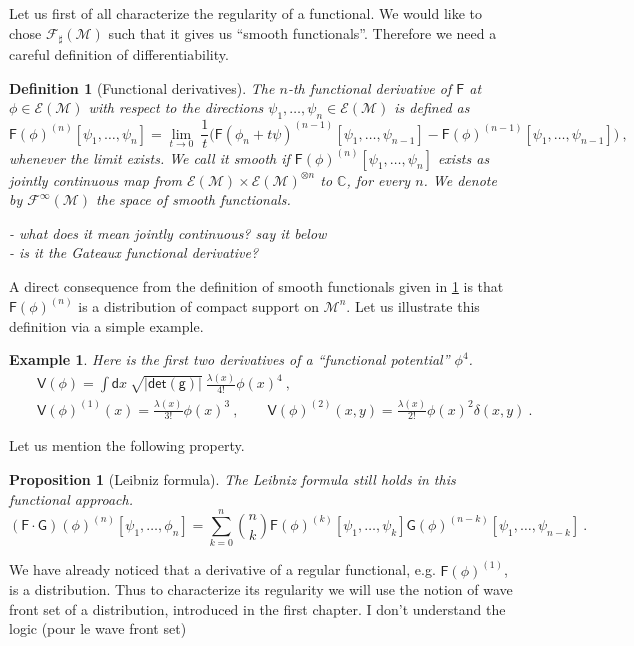 \documentclass[10pt]{book}
\newcommand{\abs}[1]{\left|#1\right|}
\renewcommand{\det}{\mathsf{det}}
\newcommand{\Ecal}{\mathcal{E}}
\newcommand{\Fcal}{\mathcal{F}}
\newcommand{\Mcal}{\mathcal{M}}
\newcommand{\Cbb}{\mathbb{C}}
\newcommand{\Fsf}{\mathsf{F}}
\newcommand{\Gsf}{\mathsf{G}}
\newcommand{\Vsf}{\mathsf{V}}
\newcommand{\dsf}{\mathsf{d}}
\newcommand{\gsf}{\mathsf{g}}
\theoremstyle{break}
\newtheorem{proposition}{Proposition}
\newtheorem{example}{Example}
\newtheorem{definition}{Definition}
\begin{document}
Let us first of all characterize the regularity of a functional. We would like to chose $\Fcal_\sharp(\Mcal)$ such that it gives us ``smooth functionals''. Therefore we need a careful definition of differentiability.%
%
\begin{definition}[Functional derivatives] \label{def:func-deriv}
The $n$-th functional derivative of $\Fsf$ at $\phi\in\Ecal(\Mcal)$ with respect to the directions $\psi_1, \dots, \psi_n \in\Ecal(\Mcal)$ is defined as%
%
\begin{equation*}%
\Fsf(\phi)^{(n)}[\psi_1,\dots ,\psi_n] = \lim_{t \to 0} \ \frac{1}{t} \bigg( \Fsf(\phi_n + t \psi)^{(n-1)}[\psi_1,\dots ,\psi_{n-1}] - \Fsf(\phi)^{(n-1)}[\psi_1,\dots ,\psi_{n-1}] \bigg) \ ,
\end{equation*}
%
whenever the limit exists. We call it smooth if $\Fsf(\phi)^{(n)}[\psi_1,\dots ,\psi_n]$ exists as jointly continuous map from $\Ecal(\Mcal) \times \Ecal(\Mcal)^{\otimes n}$ to $\Cbb$, for every $n$. We denote by $\Fcal^\infty(\Mcal)$ the space of smooth functionals.

- what does it mean jointly continuous? say it below \\
- is it the Gateaux functional derivative?

\end{definition}
%
A direct consequence from the definition of smooth functionals given in \ref{def:func-deriv} is that $\Fsf(\phi)^{(n)}$ is a distribution of compact support on $\Mcal^n$.  Let us illustrate this definition via a simple example.%
\begin{example}
%
Here is the first two derivatives of a ``functional potential'' $\phi^4$. 
%
\begin{eqnarray*}
&& \Vsf(\phi) = \int \dsf x \ \sqrt{\abs{\det(\gsf)}} \ \frac{\lambda(x)}{4!} \phi(x)^4 \ ,\\
%
&& \Vsf(\phi)^{(1)}(x) = \frac{\lambda(x)}{3!} \phi(x)^3 \ , \qquad
%
\Vsf(\phi)^{(2)}(x,y) = \frac{\lambda(x)}{2!} \phi(x)^2 \delta(x,y) \ .
\end{eqnarray*}
%
\end{example}
%
Let us mention the following property.
%
\begin{proposition}[Leibniz formula]
The Leibniz formula still holds in this functional approach.
%
\begin{equation*}
\left(\Fsf \cdot \Gsf\right)(\phi)^{(n)}[\psi_1, \dots ,\phi_n] = \sum_{k=0}^{n} \binom{n}{k} \Fsf(\phi)^{(k)}[\psi_1, \dots , \psi_k] \Gsf(\phi)^{(n-k)}[\psi_1, \dots , \psi_{n-k}] \ .
\end{equation*}
%
\end{proposition}
%
%
We have already noticed that a derivative of a regular functional, e.g. $\Fsf(\phi)^{(1)}$, is a distribution. Thus to characterize its regularity we will use the notion of wave front set of a distribution, introduced in the first chapter.%
I don’t understand the logic (pour le wave front set)
\end{document}
